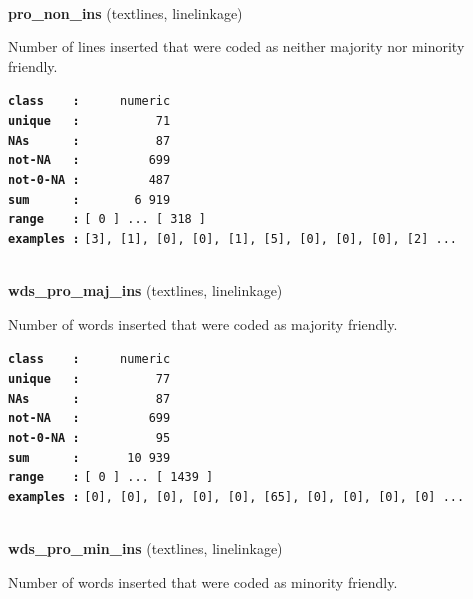\documentclass[]{article}
\begin{document}
~

\textbf{pro\_non\_ins} (textlines, linelinkage)

Number of lines inserted that were coded as neither majority nor
minority friendly.

\textbf{\texttt{class\ \ \ \ :}} \texttt{~~~~~numeric}\\
\textbf{\texttt{unique\ \ \ :}} \texttt{~~~~~~~~~~71}\\
\textbf{\texttt{NAs\ \ \ \ \ \ :}} \texttt{~~~~~~~~~~87}\\
\textbf{\texttt{not-NA\ \ \ :}} \texttt{~~~~~~~~~699}\\
\textbf{\texttt{not-0-NA\ :}} \texttt{~~~~~~~~~487}\\
\textbf{\texttt{sum\ \ \ \ \ \ :}} \texttt{~~~~~~~6~919}\\
\textbf{\texttt{range\ \ \ \ :}}
\texttt{{[}\ 0\ {]}\ ...\ {[}\ 318\ {]}}\\
\textbf{\texttt{examples\ :}}
\texttt{{[}3{]},\ {[}1{]},\ {[}0{]},\ {[}0{]},\ {[}1{]},\ {[}5{]},\ {[}0{]},\ {[}0{]},\ {[}0{]},\ {[}2{]}\ ...}\\

~

\textbf{wds\_pro\_maj\_ins} (textlines, linelinkage)

Number of words inserted that were coded as majority friendly.

\textbf{\texttt{class\ \ \ \ :}} \texttt{~~~~~numeric}\\
\textbf{\texttt{unique\ \ \ :}} \texttt{~~~~~~~~~~77}\\
\textbf{\texttt{NAs\ \ \ \ \ \ :}} \texttt{~~~~~~~~~~87}\\
\textbf{\texttt{not-NA\ \ \ :}} \texttt{~~~~~~~~~699}\\
\textbf{\texttt{not-0-NA\ :}} \texttt{~~~~~~~~~~95}\\
\textbf{\texttt{sum\ \ \ \ \ \ :}} \texttt{~~~~~~10~939}\\
\textbf{\texttt{range\ \ \ \ :}}
\texttt{{[}\ 0\ {]}\ ...\ {[}\ 1439\ {]}}\\
\textbf{\texttt{examples\ :}}
\texttt{{[}0{]},\ {[}0{]},\ {[}0{]},\ {[}0{]},\ {[}0{]},\ {[}65{]},\ {[}0{]},\ {[}0{]},\ {[}0{]},\ {[}0{]}\ ...}\\

~

\textbf{wds\_pro\_min\_ins} (textlines, linelinkage)

Number of words inserted that were coded as minority friendly.
\end{document}
